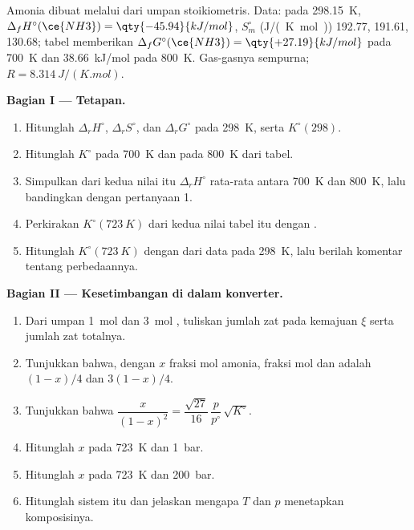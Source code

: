 \begin{problem}
\label{pb:b2:equilibrium-shifts:1}
Amonia dibuat melalui  dari umpan
stoikiometris. Data: pada \qty{298.15}{K},
$\Delta_f H^\circ(\ce{NH3}) = \qty{-45.94}{kJ/mol}$, $S^\circ_m$
(\unit{J/(K.mol)})  192.77,  191.61,  130.68; tabel
memberikan $\Delta_f G^\circ(\ce{NH3}) = \qty{+27.19}{kJ/mol}$ pada
\qty{700}{K} dan \qty{+38.66}{kJ/mol} pada \qty{800}{K}. Gas-gasnya
sempurna; $R = \qty{8.314}{J/(K.mol)}$.

\medskip
\noindent\textbf{Bagian I --- Tetapan.}
\begin{enumerate}
  \item Hitunglah $\Delta_r H^\circ$, $\Delta_r S^\circ$, dan
        $\Delta_r G^\circ$ pada \qty{298}{K}, serta $K^\circ(298)$.
  \item Hitunglah $K^\circ$ pada \qty{700}{K} dan pada \qty{800}{K} dari
        tabel.
  \item Simpulkan dari kedua nilai itu $\Delta_r H^\circ$ rata-rata antara
        \qty{700}{K} dan \qty{800}{K}, lalu bandingkan dengan pertanyaan 1.
  \item Perkirakan $K^\circ(\qty{723}{K})$ dari kedua nilai tabel itu dengan
        .
  \item Hitunglah $K^\circ(\qty{723}{K})$ dengan  dari
        data pada \qty{298}{K}, lalu berilah komentar tentang perbedaannya.
\end{enumerate}

\medskip
\noindent\textbf{Bagian II --- Kesetimbangan di dalam konverter.}
\begin{enumerate}[resume]
  \item Dari umpan \qty{1}{mol}  dan \qty{3}{mol} , tuliskan
        jumlah zat pada kemajuan $\xi$ serta jumlah zat totalnya.
  \item Tunjukkan bahwa, dengan $x$ fraksi mol amonia, fraksi mol 
        dan  adalah $(1-x)/4$ dan $3(1-x)/4$.
  \item Tunjukkan bahwa $\dfrac{x}{(1-x)^2} = \dfrac{\sqrt{27}}{16}\,\dfrac{p}{p^\circ}\,
        \sqrt{K^\circ}$.
  \item Hitunglah $x$ pada \qty{723}{K} dan \qty{1}{bar}.
  \item Hitunglah $x$ pada \qty{723}{K} dan \qty{200}{bar}.
  \item Hitunglah  sistem itu dan jelaskan mengapa $T$ dan $p$
        menetapkan komposisinya.
\end{enumerate}


\end{problem}
